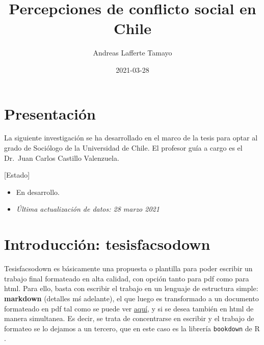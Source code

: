\documentclass[12pt,twoside]{templates/facsothesis}
\title{Percepciones de conflicto social en Chile}
\author{Andreas Lafferte Tamayo}
\date{2021-03-28}
\begin{document}

  \maketitle

\frontmatter %
\pagestyle{empty} %



  \setcounter{tocdepth}{1}
  \setlength{\parskip}{0pt}
  \tableofcontents

\setlength\parskip{1em plus 0.1em minus 0.2em}

  \listoftables

  \listoffigures



\mainmatter %
\pagestyle{fancyplain} %

\hypertarget{presentaciuxf3n}{%
\chapter*{Presentación}\label{presentaciuxf3n}}

La siguiente investigación se ha desarrollado en el marco de la tesis para optar al grado de Sociólogo de la Universidad de Chile. El profesor guía a cargo es el Dr.~Juan Carlos Castillo Valenzuela.

{[}Estado{]}

\begin{itemize}
\item
  En desarrollo.
\item
  \emph{Última actualización de datos: 28 marzo 2021}
\end{itemize}

\hypertarget{introducciuxf3n-tesisfacsodown}{%
\chapter{Introducción: tesisfacsodown}\label{introducciuxf3n-tesisfacsodown}}

Tesisfacsodown es básicamente una propuesta o plantilla para poder escribir un trabajo final formateado en alta calidad, con opción tanto para pdf como para html. Para ello, basta con escribir el trabajo en un lenguaje de estructura simple: \textbf{markdown} (detalles mś adelante), el que luego es transformado a un documento formateado en pdf tal como se puede ver \href{docs/tesis.pdf}{aquí}, y si se desea también en html de manera simultanea. Es decir, se trata de concentrarse en escribir y el trabajo de formateo se lo dejamos a un tercero, que en este caso es la librería \texttt{bookdown} de R \citep{xie_Bookdown_2017} .
\end{document}
